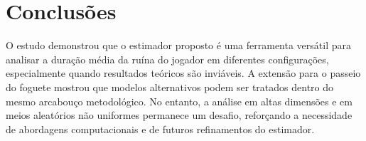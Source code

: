 \documentclass[a4paper,10pt,twocolumn]{article}
\begin{document}
\section{Conclusões}

O estudo demonstrou que o estimador proposto é uma ferramenta versátil para
analisar a duração média da ruína do jogador em diferentes configurações,
especialmente quando resultados teóricos são inviáveis. A extensão para o
passeio do foguete mostrou que modelos alternativos podem ser tratados dentro do
mesmo arcabouço metodológico. No entanto, a análise em altas dimensões e em
meios aleatórios não uniformes permanece um desafio, reforçando a necessidade de
abordagens computacionais e de futuros refinamentos do estimador.

\vspace{2.5pt}


\end{document}
